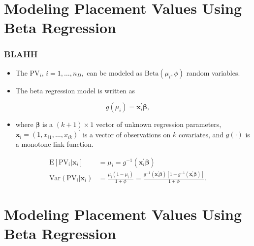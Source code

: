 \documentclass[t]{beamer}
\newcommand{\matr}[1]{\mathbf{#1}}
\begin{document}
\section{Modeling Placement Values Using Beta Regression}

\begin{frame}
	\frametitle{BLAHH}
	\begin{itemize}
		\item The $\text{PV}_i, \, i = 1, \dots, n_{D},$ can be modeled as $\text{Beta}(\mu_i, \phi)$ random variables.
		\item The beta regression model is written as
	\end{itemize}
$$g(\mu_i) = \matr{x}_i^{\prime}\bm{\beta},$$
	\vspace{-.2in}
	\begin{itemize}
		\item[] where $\bm{\beta}$ is a $(k + 1) \times 1$ vector of unknown regression parameters, $\matr{x}_i = (1, x_{i1}, \dots, x_{ik})^{\prime}$ is a vector of observations on $k$ covariates, and $g(\cdot)$ is a monotone link function.
	\end{itemize}
\vspace{-.15in}
\begin{align*}
\text{E}[\text{PV}_i|\matr{x}_i] &= \mu_i = g^{-1}(\matr{x}_i^{\prime}\bm{\beta}) \\
\text{Var}(\text{PV}_i|\matr{x}_i) &=  \frac{\mu_i(1 - \mu_i)}{1 + \phi} = \frac{g^{-1}(\matr{x}_i^{\prime}\bm{\beta})\left[1 - g^{-1}(\matr{x}_i^{\prime}\bm{\beta})\right]}{1 + \phi}.
\end{align*}
\end{frame}

\section{Modeling Placement Values Using Beta Regression}
\end{document}
